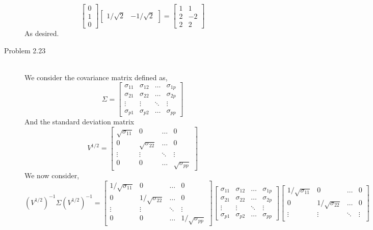 \documentclass[letterpaper,10pt]{article}
\begin{document}
\begin{description}
\[\begin{bmatrix}
0\\1\\0
\end{bmatrix}\begin{bmatrix}
1/\sqrt{2} & -1/\sqrt{2}
\end{bmatrix}=\begin{bmatrix}
1 & 1\\2 & -2\\2 & 2
\end{bmatrix} \]
As desired.
\item[Problem 2.23]\hfill\\
We consider the covariance matrix defined as,
\[\Sigma=\begin{bmatrix}
\sigma_{11} & \sigma_{12} & \ldots & \sigma_{1p}\\
\sigma_{21} & \sigma_{22} & \ldots & \sigma_{2p}\\
\vdots & \vdots & \ddots & \vdots\\
\sigma_{p1} & \sigma_{p2} & \ldots & \sigma_{pp}
\end{bmatrix} \]
And the standard deviation matrix
\[V^{1/2}=\begin{bmatrix}
\sqrt{\sigma_{11}} & 0 & \ldots & 0\\
0 & \sqrt{\sigma_{22}} & \ldots & 0\\
\vdots & \vdots & \ddots & \vdots\\
0 & 0 & \ldots & \sqrt{\sigma_{pp}}
\end{bmatrix} \]
We now consider,
\[(V^{1/2})^{-1}\Sigma(V^{1/2})^{-1}=\begin{bmatrix}
1/\sqrt{\sigma_{11}} & 0 & \ldots & 0\\
0 & 1/\sqrt{\sigma_{22}} & \ldots & 0\\
\vdots & \vdots & \ddots & \vdots\\
0 & 0 & \ldots & 1/\sqrt{\sigma_{pp}}
\end{bmatrix}\begin{bmatrix}
\sigma_{11} & \sigma_{12} & \ldots & \sigma_{1p}\\
\sigma_{21} & \sigma_{22} & \ldots & \sigma_{2p}\\
\vdots & \vdots & \ddots & \vdots\\
\sigma_{p1} & \sigma_{p2} & \ldots & \sigma_{pp}
\end{bmatrix} \begin{bmatrix}
1/\sqrt{\sigma_{11}} & 0 & \ldots & 0\\
0 & 1/\sqrt{\sigma_{22}} & \ldots & 0\\
\vdots & \vdots & \ddots & \vdots\\

\end{bmatrix}\]
\end{description}
\end{document}
